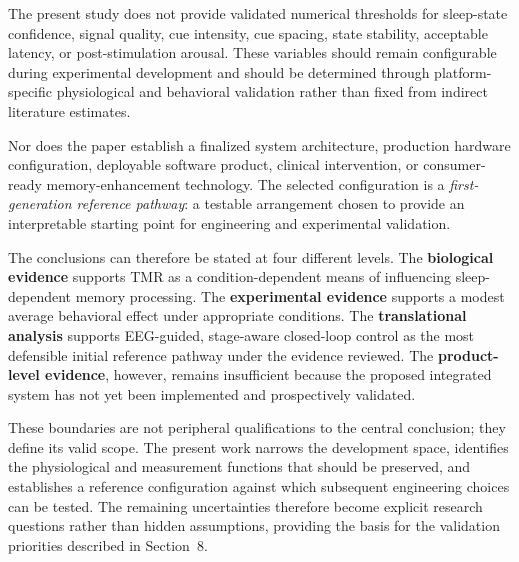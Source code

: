 The present study does not provide validated numerical thresholds for sleep-state
confidence, signal quality, cue intensity, cue spacing, state stability,
acceptable latency, or post-stimulation arousal. These variables should remain
configurable during experimental development and should be determined through
platform-specific physiological and behavioral validation rather than fixed
from indirect literature estimates.

Nor does the paper establish a finalized system architecture, production
hardware configuration, deployable software product, clinical intervention, or
consumer-ready memory-enhancement technology. The selected configuration is a
\textit{first-generation reference pathway}: a testable arrangement chosen to
provide an interpretable starting point for engineering and experimental
validation.

The conclusions can therefore be stated at four different levels. The
\textbf{biological evidence} supports TMR as a condition-dependent means of
influencing sleep-dependent memory processing. The \textbf{experimental
evidence} supports a modest average behavioral effect under appropriate
conditions. The \textbf{translational analysis} supports EEG-guided,
stage-aware closed-loop control as the most defensible initial reference
pathway under the evidence reviewed. The \textbf{product-level evidence},
however, remains insufficient because the proposed integrated system has not
yet been implemented and prospectively validated.

These boundaries are not peripheral qualifications to the central conclusion;
they define its valid scope. The present work narrows the development space,
identifies the physiological and measurement functions that should be preserved,
and establishes a reference configuration against which subsequent engineering
choices can be tested. The remaining uncertainties therefore become explicit
research questions rather than hidden assumptions, providing the basis for the
validation priorities described in Section~8.